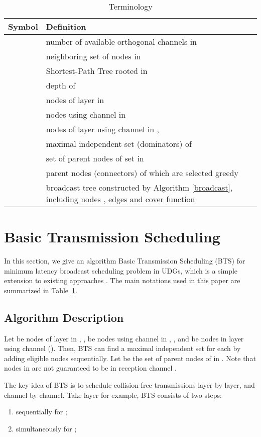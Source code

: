 \documentclass[10pt, conference]{IEEEtran}
\begin{document}
\begin{table}
\caption{Terminology}\label{terminology}
\begin{tabularx}{8.8cm}{c|p{7cm}}
\hline
Symbol & Definition \\
\hline
& number of available orthogonal channels in \\
 & neighboring set of nodes  in \\
 & Shortest-Path Tree rooted  in \\
 & depth of \\
 & nodes of layer  in  \\
 & nodes using channel  in \\
 & nodes of layer  using channel  in , \\
 & maximal independent set (dominators) of  \\
 & set of parent nodes of set  in  \\
 & parent nodes (connectors) of  which are selected greedy \\
 & broadcast tree constructed by Algorithm \ref{broadcast}, including nodes , edges  and cover function  \\
 \hline
\end{tabularx}
\end{table}

\section{Basic Transmission Scheduling} \label{bts}
In this section, we give an algorithm Basic Transmission
Scheduling (BTS) for minimum latency broadcast scheduling
problem in UDGs, which is a simple extension to existing
approaches \cite{info07, ICC09}. The main notations used in
this paper are summarized in Table~\ref{terminology}.

\subsection{Algorithm Description}


Let  be nodes of layer  in , ,  be nodes using channel  in , ,
and  be nodes in layer  using channel  (). Then, BTS can find a maximal independent set
 for each  by adding eligible nodes
sequentially. Let  be the set of parent nodes of  in
. Note that nodes in  are not guaranteed
to be in reception channel .

The key idea of BTS is to schedule collision-free
transmissions layer by layer, and channel by channel.
Take layer  for example, BTS consists of two
steps:
\begin{enumerate}
\item  sequentially for ;
\item  simultaneously for ;
\end{enumerate}
\end{document}
